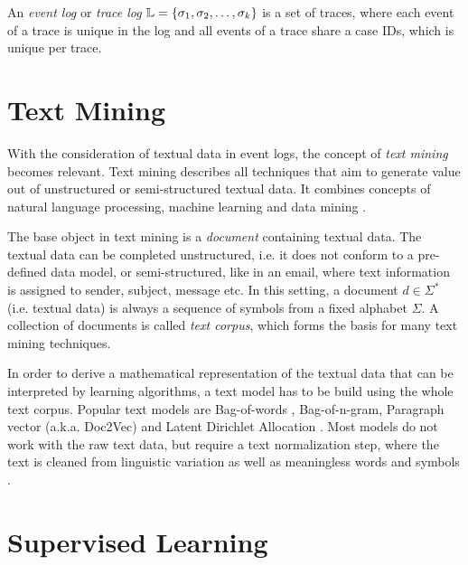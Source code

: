\begin{definition}
	An \textit{event log} or \textit{trace log} $\mathbb{L} = \{ \sigma_1, \sigma _2, \dots, \sigma_k \}$ is a set of traces, where each event of a trace is unique in the log and all events of a trace share a case IDs, which is unique per trace.
\end{definition}

\section{Text Mining}

With the consideration of textual data in event logs, the concept of \textit{text mining} becomes relevant.
Text mining describes all techniques that aim to generate value out of unstructured or semi-structured textual data.
It combines concepts of natural language processing, machine learning and data mining \cite{DBLP:journals/coling/Mihalcea08}.

The base object in text mining is a \textit{document} containing textual data.
The textual data can be completed unstructured, i.e. it does not conform to a pre-defined data model, or semi-structured, like in an email, where text information is assigned to sender, subject, message etc.
In this setting, a document $d \in \Sigma^*$ (i.e. textual data) is always a sequence of symbols from a fixed alphabet $\Sigma$.
A collection of documents is called \textit{text corpus}, which forms the basis for many text mining techniques.

In order to derive a mathematical representation of the textual data that can be interpreted by learning algorithms, a text model has to be build using the whole text corpus.
Popular text models are Bag-of-words \cite{harris1954distributional}, Bag-of-n-gram, Paragraph vector (a.k.a. Doc2Vec) \cite{DBLP:conf/icml/LeM14} and Latent Dirichlet Allocation \cite{DBLP:journals/jmlr/BleiNJ03}.
Most models do not work with the raw text data, but require a text normalization step, where the text is cleaned from linguistic variation as well as meaningless words and symbols \cite{DBLP:books/lib/JurafskyM09}.

\section{Supervised Learning}

